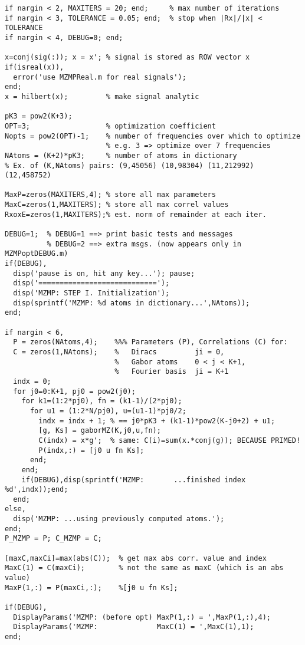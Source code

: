 \begin{small}
\begin{verbatim}
if nargin < 2, MAXITERS = 20; end;     % max number of iterations
if nargin < 3, TOLERANCE = 0.05; end;  % stop when |Rx|/|x| < TOLERANCE
if nargin < 4, DEBUG=0; end;

x=conj(sig(:)); x = x'; % signal is stored as ROW vector x
if(isreal(x)),
  error('use MZMPReal.m for real signals');
end;
x = hilbert(x);         % make signal analytic

pK3 = pow2(K+3);
OPT=3;                  % optimization coefficient
Nopts = pow2(OPT)-1;    % number of frequencies over which to optimize
                        % e.g. 3 => optimize over 7 frequencies
NAtoms = (K+2)*pK3;     % number of atoms in dictionary
% Ex. of (K,NAtoms) pairs: (9,45056) (10,98304) (11,212992) (12,458752)

MaxP=zeros(MAXITERS,4); % store all max parameters
MaxC=zeros(1,MAXITERS); % store all max correl values
RxoxE=zeros(1,MAXITERS);% est. norm of remainder at each iter.

DEBUG=1;  % DEBUG=1 ==> print basic tests and messages 
          % DEBUG=2 ==> extra msgs. (now appears only in MZMPoptDEBUG.m)
if(DEBUG),
  disp('pause is on, hit any key...'); pause;
  disp('============================');
  disp('MZMP: STEP I. Initialization');
  disp(sprintf('MZMP: %d atoms in dictionary...',NAtoms));
end;

if nargin < 6,
  P = zeros(NAtoms,4);    %%% Parameters (P), Correlations (C) for:
  C = zeros(1,NAtoms);    %   Diracs         ji = 0, 
                          %   Gabor atoms    0 < j < K+1,
                          %   Fourier basis  ji = K+1
  indx = 0;
  for j0=0:K+1, pj0 = pow2(j0);
    for k1=(1:2*pj0), fn = (k1-1)/(2*pj0);
      for u1 = (1:2*N/pj0), u=(u1-1)*pj0/2;
        indx = indx + 1; % == j0*pK3 + (k1-1)*pow2(K-j0+2) + u1;
        [g, Ks] = gaborMZ(K,j0,u,fn);
        C(indx) = x*g';  % same: C(i)=sum(x.*conj(g)); BECAUSE PRIMED!
        P(indx,:) = [j0 u fn Ks];
      end;
    end; 
    if(DEBUG),disp(sprintf('MZMP:       ...finished index %d',indx));end;
  end;
else,
  disp('MZMP: ...using previously computed atoms.');
end;
P_MZMP = P; C_MZMP = C;

[maxC,maxCi]=max(abs(C));  % get max abs corr. value and index
MaxC(1) = C(maxCi);        % not the same as maxC (which is an abs value)
MaxP(1,:) = P(maxCi,:);    %[j0 u fn Ks];

if(DEBUG),
  DisplayParams('MZMP: (before opt) MaxP(1,:) = ',MaxP(1,:),4);
  DisplayParams('MZMP:              MaxC(1) = ',MaxC(1),1);
end;


\end{verbatim}
\end{small}
